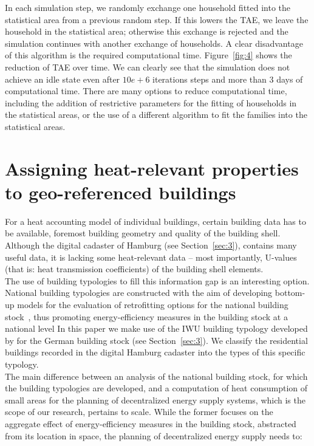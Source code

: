 \documentclass[11pt]{IJM-article}
\begin{document}
In each simulation step, we randomly exchange one household fitted into the
statistical area from a previous random step. If this lowers the TAE, we leave
the household in the statistical area; otherwise this exchange is rejected and
the simulation continues with another exchange of households. A clear
disadvantage of this algorithm is the required computational time.
Figure~\ref{fig:4} shows the reduction of TAE over time. We can clearly see
that the simulation does not achieve an idle state even after $10e+6$
iterations steps and more than 3 days of computational time. There are many
options to reduce computational time, including the addition of restrictive
parameters for the fitting of households in the statistical areas, or the use
of a different algorithm to fit the families into the statistical areas.\\

\section{Assigning heat-relevant properties to geo-referenced buildings}
\label{sec:6}

For a heat accounting model of individual buildings, certain building data has
to be available, foremost building geometry and quality of the building shell.
Although the digital cadaster of Hamburg (see Section~\ref{sec:3}), contains
many useful data, it is lacking some heat-relevant data – most importantly,
U-values (that is: heat transmission coefficients) of the building shell
elements.\\

The use of building typologies to fill this information gap is an interesting
option. National building typologies are constructed with the aim of developing
bottom-up models for the evaluation of retrofitting options for the national
building stock~\cite{TABULAProjectTeam.2012b}, thus promoting energy-efficiency
measures in the building stock at a national level  In this paper we make use of the IWU building
typology developed by  for the German building stock (see
Section~\ref{sec:3}). We classify the residential buildings recorded in the
digital Hamburg cadaster into the types of this specific typology.\\

The main difference between an analysis of the national building stock, for
which the building typologies are developed, and a computation of heat
consumption of small areas for the planning of decentralized energy supply
systems, which is the scope of our research, pertains to scale.  While the
former focuses on the aggregate effect of energy-efficiency measures in the
building stock, abstracted from its location in space, the planning of
decentralized energy supply needs to:\\
\end{document}
